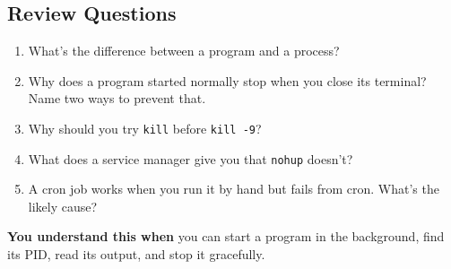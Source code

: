 \subsection*{Review Questions}\label{06-programs-that-keep-running:review-questions}

\begin{enumerate}
\def\labelenumi{\arabic{enumi}.}
\tightlist
\item
  What's the difference between a program and a process?
\item
  Why does a program started normally stop when you close its terminal? Name two ways to prevent that.
\item
  Why should you try \texttt{kill} before \texttt{kill\ -9}?
\item
  What does a service manager give you that \texttt{nohup} doesn't?
\item
  A cron job works when you run it by hand but fails from cron. What's the likely cause?
\end{enumerate}

\begin{understandbox}

\textbf{You understand this when} you can start a program in the background, find its PID, read its output, and stop it gracefully.

\end{understandbox}
